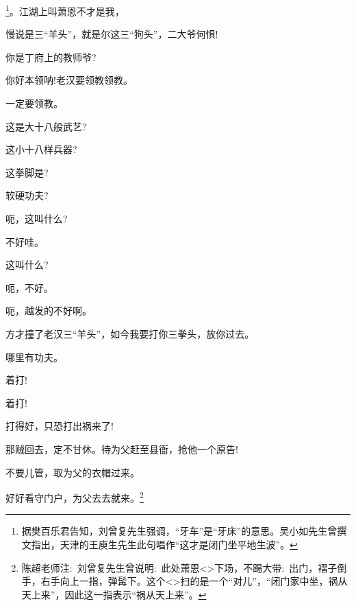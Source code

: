 {

\footnote{据樊百乐君告知，刘曾复先生强调，``牙车''是``牙床''的意思。吴小如先生曾撰文指出，天津的王庾生先生此句唱作``这才是闭门坐平地生波''。}{。江湖上叫萧恩不才是我，}



{慢说是三``羊头''，就是尔这三``狗头''，二大爷何惧!}

{你是丁府上的教师爷?}

{你好本领呐!老汉要领教领教。}

{一定要领教。}

{这是大十八般武艺?}

{这小十八样兵器?}

{这拳脚是?}

{软硬功夫?}

{呃，这叫什么?}

{不好哇。}\hspace{10pt}~

{这叫什么?}

{呃，不好。}

{呃，越发的不好啊。}

{方才撞了老汉三``羊头''，如今我要打你三拳头，放你过去。}

{哪里有功夫。}

{着打!}\hspace{20pt}~

{着打!}\hspace{20pt}~

{打得好，只恐打出祸来了!}

{那贼回去，定不甘休。待为父赶至县衙，抢他一个原告!}

{不要儿管，取为父的衣帽过来。}

{好好看守门户，为父去去就来。}\footnote{陈超老师注:~刘曾复先生曾说明:~此处萧恩\textless{}\!\textgreater{}下场，不踢大带:~出门，褶子倒手，右手向上一指，弹髯下。这个\textless{}\!\textgreater{}扫的是一个``对儿''，``闭门家中坐，祸从天上来''，因此这一指表示``祸从天上来''。}

\vspace{5pt}

}
